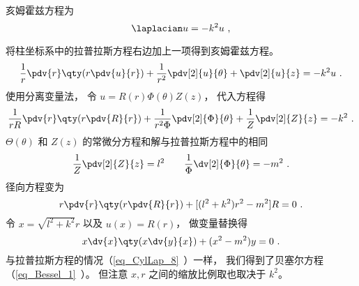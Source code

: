 
\begin{issues}
\issueDraft
\end{issues}


亥姆霍兹方程为
\begin{equation}
\laplacian u = -k^2 u~,
\end{equation}

将柱坐标系中的拉普拉斯方程右边加上一项得到亥姆霍兹方程。
\begin{equation}
\frac{1}{r} \pdv{r} \qty(r\pdv{u}{r}) + \frac{1}{r^2} \pdv[2]{u}{\theta} + \pdv[2]{u}{z} = -k^2 u~.
\end{equation}
使用分离变量法， 令 $u = R(r) \Phi(\theta) Z(z)$， 代入方程得
\begin{equation}
\frac{1}{rR}\pdv{r} \qty(r\pdv{R}{r}) + \frac{1}{r^2 \Phi} \pdv[2]{\Phi}{\theta} + \frac{1}{Z} \pdv[2]{Z}{z} = -k^2~.
\end{equation}
$\Theta(\theta)$ 和 $Z(z)$ 的常微分方程和解与拉普拉斯方程中的相同
\begin{equation}
\frac{1}{Z} \pdv[2]{Z}{z} = l^2 \qquad
\frac{1}{\Phi} \dv[2]{\Phi}{\theta} = -m^2~.
\end{equation}
径向方程变为
\begin{equation}
r\pdv{r} \qty(r\pdv{R}{r}) + [(l^2 + k^2)r^2 - m^2]R  = 0~.
\end{equation}
令 $x = \sqrt{l^2 + k^2}r$ 以及 $u(x) = R(r)$， 做变量替换得
\begin{equation}\label{eq_CylHlm_1}
x \dv{x} \qty(x\dv{y}{x}) + (x^2 - m^2)y = 0~.
\end{equation}
与拉普拉斯方程的情况（\autoref{eq_CylLap_8}~）一样， 我们得到了贝塞尔方程（\autoref{eq_Bessel_1}~）。 但注意 $x, r$ 之间的缩放比例取也取决于 $k^2$。
